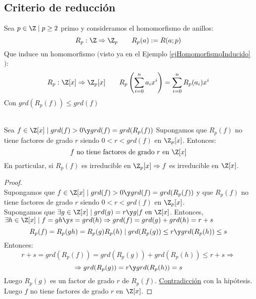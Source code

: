 \subsection{Criterio de reducción}

Sea $p \in \Z \mid p\geq 2$ primo y consideramos el homomorfismo de anillos:
$$R_p:\Z\Rightarrow \Z_p~~~~~~R_p(a):=R(a;p)$$
Que induce un homomorfismo $($visto ya en el Ejemplo \ref{ejHomomorfismoInducido}$)$:
$$R_p:\Z[x]\Rightarrow \Z_p[x]~~~~~~R_p\left(\sum_{i=0}^n a_i x^i \right) = \sum_{i=0}^n R_p(a_i)x^i$$
Con $grd(R_p(f)) \leq grd(f)$

\begin{prop}
    \ \\
    Sea $f \in \Z[x] \mid grd(f)>0 \y grd(f)=grd(R_p(f))$\newline
    Supongamos que $R_p(f)$ no tiene factores de grado $r$ siendo $0<r<grd(f)$ en $\Z_p[x]$. Entonces:
    $$f \mbox{ no tiene factores de grado } r \mbox{ en } \Z[x]$$
    En particular, si $R_p(f)$ es irreducible en $\Z_p[x] \Rightarrow f$ es irreducible en $\Z[x]$.
\begin{proof}
    \ \\
    Supongamos que $f \in \Z[x] \mid grd(f)>0 \y grd(f)=grd(R_p(f))$ y que $R_p(f)$ no tiene factores de grado
    $r$ siendo $0<r<grd(f)$ en $\Z_p[x]$.\\

    
    Supongamos que $\exists g \in \Z[x] \mid grd(g)=r \y g|f \mbox{ en } \Z[x]$.\newline
    Entonces, $\exists h \in \Z[x] \mid f=gh \y s=grd(h) \Rightarrow grd(f)=grd(g)+grd(h)=r+s$
    $$R_p(f)=R_p(gh)=R_p(g)R_p(h) \mid grd(R_p(g))\leq r \y grd(R_p(h))\leq s$$ Entonces:
    $$r+s = grd(R_p(f)) = grd(R_p(g))+grd(R_p(h)) \leq r+s \Rightarrow$$
    $$\Rightarrow grd(R_p(g))=r \y grd(R_p(h))=s$$
    Luego $R_p(g)$ es un factor de grado $r$ de $R_p(f)$. \underline{Contradicción} con la hipótesis.\\

    
    Luego $f$ no tiene factores de grado $r$ en $\Z[x]$.
\end{proof}
\end{prop}



